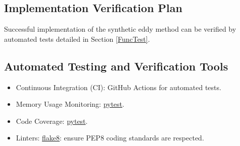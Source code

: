 \documentclass[12pt, titlepage]{article}
\begin{document}


\subsection{Implementation Verification Plan}

Successful implementation of the synthetic eddy method can be verified by automated tests detailed in Section \ref{FuncTest}.



\subsection{Automated Testing and Verification Tools}

\begin{itemize}
  \item Continuous Integration (CI): GitHub Actions for automated tests.
  \item Memory Usage Monitoring: \href{https://docs.pytest.org/}{pytest}.
  \item Code Coverage: \href{https://docs.pytest.org/}{pytest}.
  \item Linters: \href{https://marketplace.visualstudio.com/items?itemName=ms-python.flake8}{flake8}: ensure PEP8 coding standards are respected.
\end{itemize}


\end{document}
